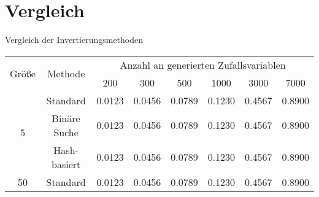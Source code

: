 \section{Vergleich}


\begin{frame}{Vergleich der Invertierungsmethoden}
    \begin{table}
        \centering
        \begin{tabular}{c|c|c|c|c|c|c|c}
            \multirow{2}{*}{Größe} & \multirow{2}{*}{Methode} & \multicolumn{6}{c}{Anzahl an generierten Zufallsvariablen} \\
            \cline{3-8} & & 200 & 300 & 500 & 1000 & 3000 & 7000 \\
            \hline\hline
            \multirow{3}{*}{5} & Standard & 0.0123 & 0.0456 & 0.0789 & 0.1230 & 0.4567 & 0.8900 \\
             & Binäre Suche & 0.0123 & 0.0456 & 0.0789 & 0.1230 & 0.4567 & 0.8900 \\
             & Hash-basiert & 0.0123 & 0.0456 & 0.0789 & 0.1230 & 0.4567 & 0.8900 \\
            \hline
            \multirow{3}{*}{50} & Standard & 0.0123 & 0.0456 & 0.0789 & 0.1230 & 0.4567 & 0.8900 \\

\end{tabular}
\end{table}
\end{frame}
